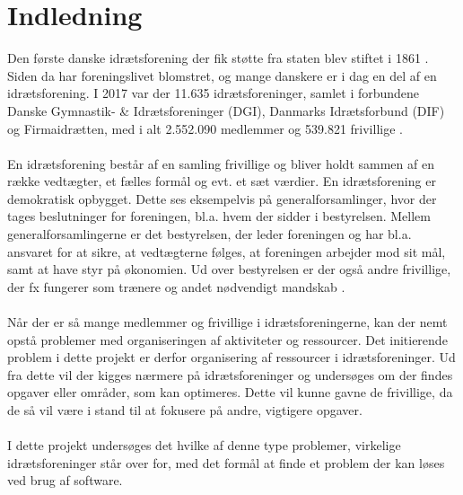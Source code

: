 \chapter{Indledning}\label{ch:introduction}
Den første danske idrætsforening der fik støtte fra staten blev stiftet i 1861 \cite{difhistorie}.\\
Siden da har foreningslivet blomstret, og mange danskere er i dag en del af en idrætsforening. I 2017 var der 11.635 idrætsforeninger, samlet i forbundene Danske Gymnastik- \& Idrætsforeninger (DGI), Danmarks Idrætsforbund (DIF) og Firmaidrætten, med i alt 2.552.090 medlemmer og 539.821 frivillige \cite{fester2018}.
\\\\
En idrætsforening består af en samling frivillige og bliver holdt sammen af en række vedtægter, et fælles formål og evt. et sæt værdier. En idrætsforening er demokratisk opbygget. Dette ses eksempelvis på generalforsamlinger, hvor der tages beslutninger for foreningen, bl.a. hvem der sidder i bestyrelsen. Mellem generalforsamlingerne er det bestyrelsen, der leder foreningen og har bl.a. ansvaret for at sikre, at vedtægterne følges, at foreningen arbejder mod sit mål, samt at have styr på økonomien. Ud over bestyrelsen er der også andre frivillige, der fx fungerer som trænere og andet nødvendigt mandskab \citep{DGI} \citep{bestyrelsen}.
\\\\
Når der er så mange medlemmer og frivillige i idrætsforeningerne, kan der nemt opstå problemer med organiseringen af aktiviteter og ressourcer. Det initierende problem i dette projekt er derfor organisering af ressourcer i idrætsforeninger.
Ud fra dette vil der kigges nærmere på idrætsforeninger og undersøges om der findes opgaver eller områder, som kan optimeres. Dette vil kunne gavne de frivillige, da de så vil være i stand til at fokusere på andre, vigtigere opgaver.
\\\\
I dette projekt undersøges det hvilke af denne type problemer, virkelige idrætsforeninger står over for, med det formål at finde et problem der kan løses ved brug af software.





